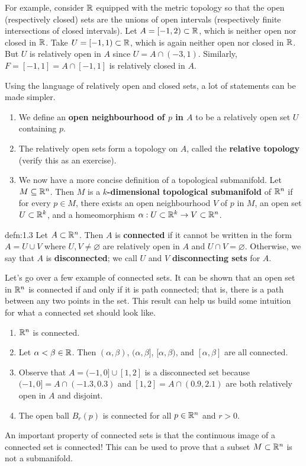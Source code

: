 For example, consider $\mathbb{R}$ equipped with the metric topology so that 
the open (respectively closed) sets are the unions of open intervals 
(respectively finite intersections of closed intervals). Let 
$A = [-1, 2) \subset \mathbb{R}$, which is neither open nor closed in $\mathbb{R}$. 
Take $U = [-1, 1) \subset \mathbb{R}$, which is again neither open nor closed in $\mathbb{R}$. 
But $U$ is relatively open in $A$ since $U = A \cap (-3, 1)$. Similarly, 
$F = [-1, 1] = A \cap [-1, 1]$ is relatively closed in $A$. 

Using the language of relatively open and closed sets, a lot of statements 
can be made simpler.
\begin{enumerate}[(1)]
    \item We define an {\bf open neighbourhood of $p$ in $A$} to be a relatively 
    open set $U$ containing $p$.
    \item The relatively open sets form a topology on $A$, called the 
    {\bf relative topology} (verify this as an exercise).
    \item We now have a more concise definition of a topological submanifold. 
    Let $M \subseteq \mathbb{R}^n$. Then $M$ is a {\bf $k$-dimensional topological 
    submanifold} of $\mathbb{R}^n$ if for every $p \in M$, there exists an 
    open neighbourhood $V$ of $p$ in $M$, an open set $U \subset \mathbb{R}^k$, 
    and a homeomorphism $\alpha : U \subset \mathbb{R}^k \to V \subset \mathbb{R}^n$. 
\end{enumerate}

\begin{defn}{defn:1.3}
    Let $A \subset \mathbb{R}^n$. Then $A$ is {\bf connected} if it cannot be written 
    in the form $A = U \cup V$ where $U, V \neq \varnothing$ are relatively 
    open in $A$ and $U \cap V = \varnothing$. Otherwise, we say that $A$ 
    is {\bf disconnected}; we call $U$ and $V$ {\bf disconnecting sets} for $A$.
\end{defn}\vspace{-0.25cm}

Let's go over a few example of connected sets. 
It can be shown that an open set in $\mathbb{R}^n$ is connected if and only if 
it is path connected; that is, there is a path between any two points in the set.
This result can help us build some intuition for what a connected set should 
look like. 
\begin{enumerate}[(1)]
    \item $\mathbb{R}^n$ is connected.
    \item Let $\alpha < \beta \in \mathbb{R}$. Then $(\alpha, \beta)$, 
    $(\alpha, \beta]$, $[\alpha, \beta)$, and $[\alpha, \beta]$ are 
    all connected. 
    \item Observe that $A = (-1, 0] \cup [1, 2]$ is a disconnected set because 
    $(-1, 0] = A \cap (-1.3, 0.3)$ and $[1, 2] = A \cap (0.9, 2.1)$ are 
    both relatively open in $A$ and disjoint. 
    \item The open ball $B_r(p)$ is connected for all $p \in \mathbb{R}^n$ and $r > 0$. 
\end{enumerate}
An important property of connected sets is that the continuous image of a 
connected set is connected! This can be used to prove that a subset 
$M \subset \mathbb{R}^n$ is not a submanifold. 

